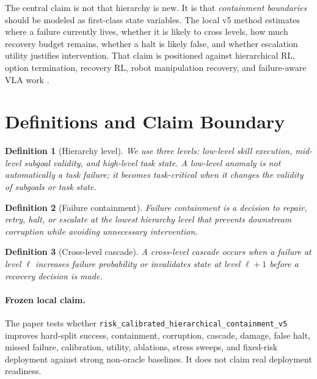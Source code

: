 \documentclass{article}
\newtheorem{definition}{Definition}
\begin{document}
The central claim is not that hierarchy is new. It is that \emph{containment boundaries} should be modeled as first-class state variables. The local v5 method estimates where a failure currently lives, whether it is likely to cross levels, how much recovery budget remains, whether a halt is likely false, and whether escalation utility justifies intervention. That claim is positioned against hierarchical RL, option termination, recovery RL, robot manipulation recovery, and failure-aware VLA work \citep{chen2026reconvla13,berducci2025hprs14,sini2022a15,bhat2025grounding16,zrobek2026hierarchical17,gu2025safe18,kalluraya2023resilient19,kim2026hierarchical20,zhang2025dthrl21,ginesi2020autonomous22,wei2025hierarchical23,dawson2023a24,willibald2026hierarchical25,wang2026multimodal26,jaber2026hclsm27,singhndstate28,wei2025hierarchical29,jin2022a30}.

\section{Definitions and Claim Boundary}
\begin{definition}[Hierarchy level]
We use three levels: low-level skill execution, mid-level subgoal validity, and high-level task state. A low-level anomaly is not automatically a task failure; it becomes task-critical when it changes the validity of subgoals or task state.
\end{definition}

\begin{definition}[Failure containment]
Failure containment is a decision to repair, retry, halt, or escalate at the lowest hierarchy level that prevents downstream corruption while avoiding unnecessary intervention.
\end{definition}

\begin{definition}[Cross-level cascade]
A cross-level cascade occurs when a failure at level $\ell$ increases failure probability or invalidates state at level $\ell+1$ before a recovery decision is made.
\end{definition}

\paragraph{Frozen local claim.}
The paper tests whether \texttt{risk\_calibrated\_hierarchical\_containment\_v5} improves hard-split success, containment, corruption, cascade, damage, false halt, missed failure, calibration, utility, ablations, stress sweeps, and fixed-risk deployment against strong non-oracle baselines. It does not claim real deployment readiness.
\end{document}
